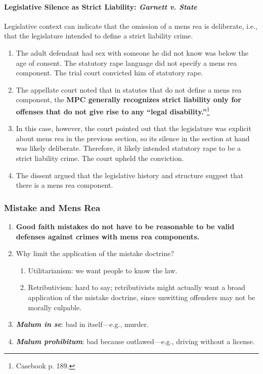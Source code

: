 \paragraph{Legislative Silence as Strict Liability: \emph{Garnett v. State}}

Legislative context can indicate that the omission of a mens rea is 
deliberate, i.e., that the legislature intended to define a strict liability 
crime.

\begin{enumerate}
    \item The adult defendant had sex with someone he did not know was below 
    the age of consent. The statutory rape language did not specify a mens rea 
    component. The trial court convicted him of statutory rape.
    \item The appellate court noted that in statutes that do not define a mens 
    rea component, the \textbf{MPC generally recognizes strict liability only for 
    offenses that do not give rise to any ``legal 
    disability.''}\footnote{Casebook p. 189.}
    \item In this case, however, the court pointed out that the legislature 
    was explicit about mens rea in the previous section, so its silence in the 
    section at hand was likely deliberate. Therefore, it likely intended 
    statutory rape to be a strict liability crime. The court upheld the 
    conviction.
    \item The dissent argued that the legislative history and structure 
    suggest that there is a mens rea component.
\end{enumerate}

\subsubsection{Mistake and Mens Rea}

\begin{enumerate}
    \item \textbf{Good faith mistakes do not have to be reasonable to be valid 
    defenses against crimes with mens rea components.}
    \item Why limit the application of the mistake doctrine?
    \begin{enumerate}
        \item Utilitarianism: we want people to know the law.
        \item Retributivism: hard to say; retributivists might actually want a 
        broad application of the mistake doctrine, since unwitting offenders 
        may not be morally culpable.
    \end{enumerate}
    \item \textbf{\emph{Malum in se}}: bad in itself---e.g., murder.
    \item \textbf{\emph{Malum prohibitum}}: bad because outlawed---e.g., 
    driving without a license.
\end{enumerate}

